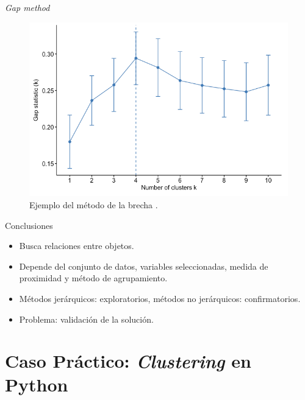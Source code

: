 \documentclass[spanish]{beamer}
\begin{document}
\begin{frame}{\textit{Gap method}}
	\begin{figure}[H]
		\centering
		\includegraphics[scale=0.32]{pedro/gapGraph}
		\caption{Ejemplo del método de la brecha \cite{gapGraph}.}
	\end{figure}
\end{frame}

\begin{frame}{Conclusiones}
\begin{itemize}
\item Busca relaciones entre objetos.\break
\item Depende del conjunto de datos, variables seleccionadas, medida de proximidad y método de agrupamiento.\break
\item Métodos jerárquicos: exploratorios, métodos no jerárquicos: confirmatorios.\break
\item Problema: validación de la solución.\break
\end{itemize}
\end{frame}


\section{Caso Práctico: \textit{Clustering} en Python}
\end{document}
